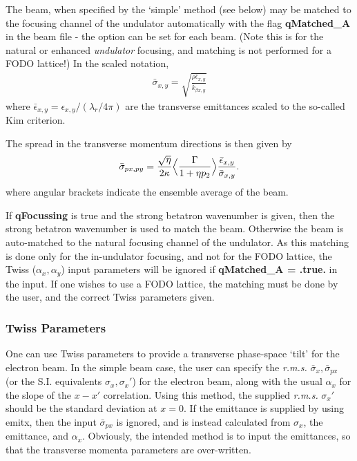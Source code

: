 \documentclass[12pt]{article}%
\begin{document}
The beam, when specified by the `simple' method (see below) may be matched to the focusing channel of the undulator automatically with the flag {\bf qMatched\_A} in the beam file - the option can be set for each beam. (Note this is for the natural or enhanced \textit{undulator} focusing, and matching is not performed for a FODO lattice!) In the scaled notation,
\begin{align}
\bar{\sigma}_{x,y} = \sqrt{  \frac{ \rho \bar{\epsilon}_{x,y} }{\bar{k}_{\beta x,y} }  }
\end{align}
where $\bar{\epsilon}_{x,y} = \epsilon_{x,y} / (\lambda_r / 4\pi)$ are the transverse emittances scaled to the so-called Kim criterion.



The spread in the transverse momentum directions is then given by
\begin{align}
\bar{\sigma}_{px, py} = \frac{\sqrt{\eta}}{2 \kappa} \Bigl<  \frac{\Gamma}{1+\eta p_{2}}  \Bigr> \frac{ \bar{\epsilon}_{x,y} }{\bar{ \sigma}_{x,y}}.   \label{tmtch_spd}
\end{align}
where angular brackets indicate the ensemble average of the beam.

If {\bf qFocussing} is true and the strong betatron wavenumber is given, then the strong betatron wavenumber is used to match the beam. Otherwise the beam is auto-matched to the natural focusing channel of the undulator. As this matching is done only for the in-undulator focusing, and not for the FODO lattice, the Twiss ($\alpha_x, \alpha_y$) input parameters will be ignored if {\bf qMatched\_A = .true.} in the input. If one wishes to use a FODO lattice, the matching must be done by the user, and the correct Twiss parameters given.



\subsubsection{Twiss Parameters}

One can use Twiss parameters to provide a transverse phase-space `tilt' for the electron beam. In the simple beam case, the user can specify the \textit{r.m.s.} $\bar{\sigma}_x, \bar{\sigma}_{px}$ (or the S.I. equivalents $\sigma_x, \sigma_{x}'$) for the electron beam, along with the usual $\alpha_x$ for the slope of the $x-x'$ correlation. Using this method, the supplied \textit{r.m.s.} $\sigma_{x}'$ should be the standard deviation at $x=0$. If the emittance is supplied by using {emitx}, then the input $\bar{\sigma}_{px}$ is ignored, and is instead calculated from $\sigma_x$, the emittance, and $\alpha_x$. Obviously, the intended method is to input the emittances, so that the transverse momenta parameters are over-written.
\end{document}
